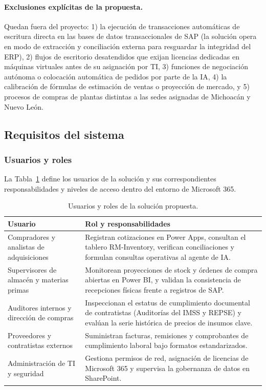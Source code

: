 \paragraph{Exclusiones explícitas de la propuesta.} Quedan fuera del proyecto: 1) la ejecución de transacciones automáticas de escritura directa en las bases de datos transaccionales de SAP (la solución opera en modo de extracción y conciliación externa para resguardar la integridad del ERP), 2) flujos de escritorio desatendidos que exijan licencias dedicadas en máquinas virtuales antes de su asignación por TI, 3) funciones de negociación autónoma o colocación automática de pedidos por parte de la IA, 4) la calibración de fórmulas de estimación de ventas o proyección de mercado, y 5) procesos de compras de plantas distintas a las sedes asignadas de Michoacán y Nuevo León.

\subsection{Requisitos del sistema}

\subsubsection{Usuarios y roles}

La Tabla~\ref{tab:roles} define los usuarios de la solución y sus correspondientes responsabilidades y niveles de acceso dentro del entorno de Microsoft 365.

\begin{table}[H]
  \centering
  \caption{Usuarios y roles de la solución propuesta.}
  \label{tab:roles}
  \begin{tabular}{@{}p{3.8cm}p{8.4cm}@{}}
    \toprule
    \textbf{Usuario} & \textbf{Rol y responsabilidades} \\
    \midrule
    Compradores y analistas de adquisiciones & Registran cotizaciones en Power Apps, consultan el tablero RM-Inventory, verifican conciliaciones y formulan consultas operativas al agente de IA. \\
    \addlinespace
    Supervisores de almacén y materias primas & Monitorean proyecciones de stock y órdenes de compra abiertas en Power BI, y validan la consistencia de recepciones físicas frente a registros de SAP. \\
    \addlinespace
    Auditores internos y dirección de compras & Inspeccionan el estatus de cumplimiento documental de contratistas (Auditorías del IMSS y REPSE) y evalúan la serie histórica de precios de insumos clave. \\
    \addlinespace
    Proveedores y contratistas externos & Suministran facturas, remisiones y comprobantes de cumplimiento laboral bajo formatos estandarizados. \\
    \addlinespace
    Administración de TI y seguridad & Gestiona permisos de red, asignación de licencias de Microsoft 365 y supervisa la gobernanza de datos en SharePoint. \\
    \bottomrule
  \end{tabular}
\end{table}


